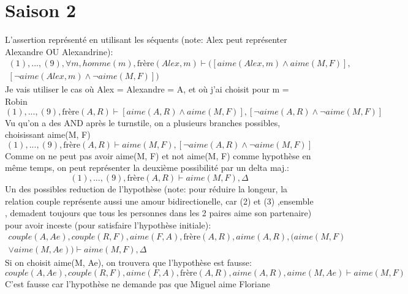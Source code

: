 \documentclass{article}
\begin{document}
\section{Saison 2}
    L'assertion représenté en utilisant les séquents (note: Alex peut représenter Alexandre OU Alexandrine):
    \begin{displaymath}
    \begin{split}
    (1), ..., (9), \forall m, homme(m), \text{frère}(Alex, m) \vdash ([aime(Alex, m) \land aime(M, F)], \\
    [\neg aime(Alex, m) \land \neg aime(M, F)])
    \end{split}
    \end{displaymath}
    Je vais utiliser le cas où Alex = Alexandre = A, et où j'ai choisit pour m = Robin
    \begin{displaymath}
    (1), ..., (9), \text{frère}(A, R) \vdash [aime(A, R) \land aime(M, F)], [\neg aime(A, R) \land \neg aime(M, F)]
    \end{displaymath}
    Vu qu'on a des AND après le turnstile, on a plusieurs branches possibles, choisissant aime(M, F) 
    \begin{displaymath}
    (1), ..., (9), \text{frère}(A, R) \vdash aime(M, F), [\neg aime(A, R) \land \neg aime(M, F)]
    \end{displaymath}
    Comme on ne peut pas avoir aime(M, F) et not aime(M, F) comme hypothèse en même temps, on peut représenter la deuxième possibilité par un delta maj.:
    \begin{displaymath}
    (1), ..., (9), \text{frère}(A, R) \vdash aime(M, F), \Delta
    \end{displaymath}
    Un des possibles reduction de l'hypothèse (note: pour réduire la longeur, la relation couple représente aussi une amour bidirectionelle, car (2) et (3) ,ensemble , demadent toujours que tous les personnes dans les 2 paires aime son partenaire) pour avoir inceste (pour satisfaire l'hypothèse initiale):
    \begin{displaymath}
    \begin{split}
    couple(A, Ae), couple(R, F), aime(F, A), \text{frère}(A, R), aime(A, R), (aime(M, F) \\
    \lor aime(M, Ae)) \vdash aime(M, F), \Delta
    \end{split}
    \end{displaymath}
    Si on choisit aime(M, Ae), on trouvera que l'hypothèse est fausse:
    \begin{displaymath}
    couple(A, Ae), couple(R, F), aime(F, A), \text{frère}(A, R), aime(A, R), aime(M, Ae) \vdash aime(M, F)
    \end{displaymath}
    C'est fausse car l'hypothèse ne demande pas que Miguel aime Floriane
\end{document}
